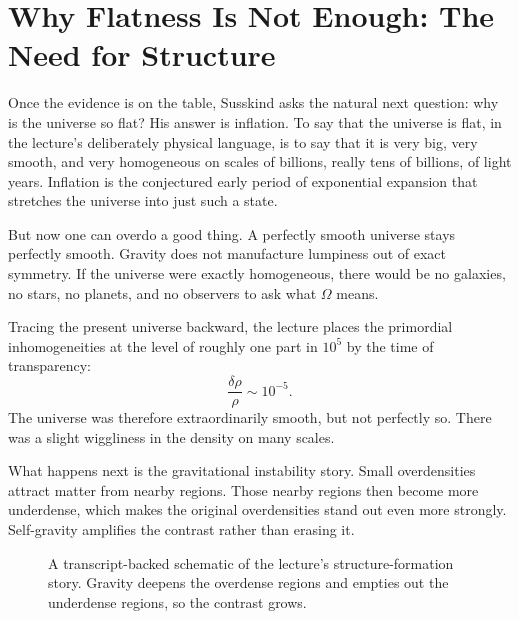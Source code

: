 \section{Why Flatness Is Not Enough: The Need for Structure}

Once the evidence is on the table, Susskind asks the natural next question: why is the universe so flat? His answer is inflation. To say that the universe is flat, in the lecture's deliberately physical language, is to say that it is very big, very smooth, and very homogeneous on scales of billions, really tens of billions, of light years. Inflation is the conjectured early period of exponential expansion that stretches the universe into just such a state.

But now one can overdo a good thing. A perfectly smooth universe stays perfectly smooth. Gravity does not manufacture lumpiness out of exact symmetry. If the universe were exactly homogeneous, there would be no galaxies, no stars, no planets, and no observers to ask what \(\Omega\) means.

Tracing the present universe backward, the lecture places the primordial inhomogeneities at the level of roughly one part in \(10^5\) by the time of transparency:
\begin{equation}
\frac{\delta\rho}{\rho}\sim 10^{-5}.
\end{equation}
The universe was therefore extraordinarily smooth, but not perfectly so. There was a slight wiggliness in the density on many scales.

What happens next is the gravitational instability story. Small overdensities attract matter from nearby regions. Those nearby regions then become more underdense, which makes the original overdensities stand out even more strongly. Self-gravity amplifies the contrast rather than erasing it.

\begin{figure}[t]
\centering
{}
\caption{A transcript-backed schematic of the lecture's structure-formation story. Gravity deepens the overdense regions and empties out the underdense regions, so the contrast grows.}
\end{figure}

